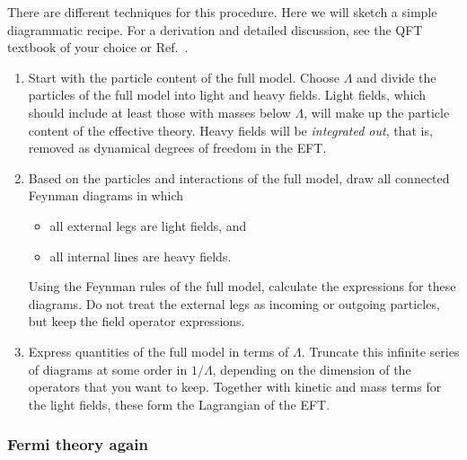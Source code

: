 There are different techniques for this procedure. Here we will sketch
a simple diagrammatic recipe. For a derivation and detailed
discussion, see the QFT textbook of your choice or
Ref.~\cite{Henning:2014wua}.
%
\begin{enumerate}
\item Start with the particle content of the full model. Choose
  $\Lambda$ and divide the particles of the full model into light and
  heavy fields. Light fields, which should include at least those with
  masses below $\Lambda$, will make up the particle content of the
  effective theory. Heavy fields will be \emph{integrated out}, that
  is, removed as dynamical degrees of freedom in the EFT.
%
\item Based on the particles and interactions of the full model, draw
  all connected Feynman diagrams in which
%
  \begin{itemize}
    \item all external legs are light fields, and
    \item all internal lines are heavy fields.
  \end{itemize}
%
  Using the Feynman rules of the full model, calculate the expressions
  for these diagrams. Do not treat the external legs as incoming or
  outgoing particles, but keep the field operator expressions.
%
\item Express quantities of the full model in terms of
  $\Lambda$. Truncate this infinite series of diagrams at some order
  in $1/\Lambda$, depending on the dimension of the operators that you
  want to keep. Together with kinetic and mass terms for the light
  fields, these form the Lagrangian of the EFT.
\end{enumerate}



  
\subsubsection*{Fermi theory again}

